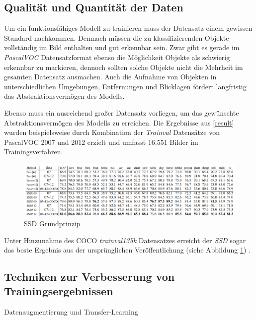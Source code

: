 \subsection{Qualität und Quantität der Daten}

Um ein funktionsfähiges Modell zu trainieren muss der Datensatz einem gewissen Standard nachkommen. Demnach müssen die zu klassifizierenden Objekte vollständig im Bild enthalten und gut erkennbar sein. Zwar gibt es gerade im \textit{PascalVOC} Datensatzformat ebenso die Möglichkeit Objekte als \glqq schwierig erkennbar\grqq{} zu markieren, dennoch sollten solche Objekte nicht die Mehrheit im gesamten Datensatz ausmachen. Auch die Aufnahme von Objekten in unterschiedlichen Umgebungen, Entfernungen und Blicklagen fördert langfristig das Abstraktionsvermögen des Modells. 

Ebenso muss ein ausreichend großer Datensatz vorliegen, um das gewünschte Abstraktionsvermögen des Modells zu erreichen. Die Ergebnisse aus \ref{result} wurden beispielsweise durch Kombination der \textit{Trainval} Datensätze von PascalVOC 2007 und 2012 erzielt und umfasst 16.551 Bilder im Trainingsverfahren. \cite{ssd.20161229} \cite{MarkEveringham.20070607} \cite{MarkEveringham.20120521}

\begin{figure}[ht]
	\begin{center}
		\includegraphics[width=15cm]{Bilder/ssd_results_details.png} 
		\caption[SSD Grundprinzip]{SSD Grundprinzip \cite{ssd.20161229}}
		\label{amountofdata}
	\end{center}
\end{figure}

Unter Hinzunahme des COCO \textit{trainval135k} Datensatzes erreicht der \textit{SSD} sogar das beste Ergebnis aus der ursprünglichen Veröffentlichung (siehe Abbildung \ref{amountofdata}) \cite{ssd.20161229}. 

\subsection{Techniken zur Verbesserung von Trainingsergebnissen}

Datenaugmentierung und Transfer-Learning
